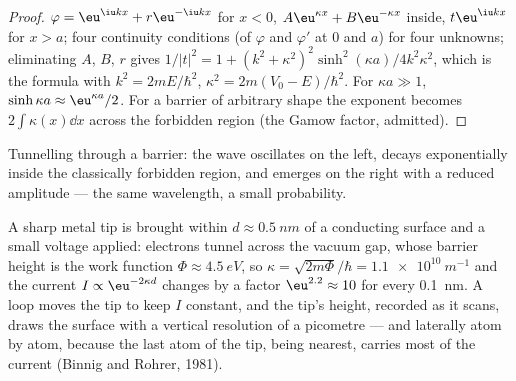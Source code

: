 \begin{proof}
$\varphi = \eu^{\iu kx} + r\eu^{-\iu kx}$ for $x < 0$, $A\eu^{\kappa x} + B\eu^{-\kappa x}$
inside, $t\eu^{\iu kx}$ for $x > a$; four continuity conditions (of $\varphi$
and $\varphi'$ at $0$ and $a$) for four unknowns; eliminating $A$, $B$, $r$
gives $1/|t|^2 = 1 + (k^2 + \kappa^2)^2\sinh^2(\kappa a)/4k^2\kappa^2$, which is
the formula with $k^2 = 2mE/\hbar^2$, $\kappa^2 = 2m(V_0 - E)/\hbar^2$. For
$\kappa a \gg 1$, $\sinh\kappa a \approx \eu^{\kappa a}/2$. For a barrier of
arbitrary shape the exponent becomes $2\int\kappa(x)\dd x$ across the
forbidden region (the Gamow factor, admitted).
\end{proof}

\begin{omfigure}

{\small Tunnelling through a barrier: the wave oscillates on the left,
decays exponentially inside the classically forbidden region, and
emerges on the right with a reduced amplitude --- the same wavelength,
a small probability.}
\end{omfigure}

\begin{example}\label{ex:b2:potential-wells-tunneling:stm}
A sharp metal tip is brought within $d \approx \qty{0.5}{nm}$ of a
conducting surface and a small voltage applied: electrons tunnel across
the vacuum gap, whose barrier height is the work function $\Phi \approx
\qty{4.5}{eV}$, so $\kappa = \sqrt{2m\Phi}/\hbar = \qty{1.1e10}{m^{-1}}$ and
the current $I \propto \eu^{-2\kappa d}$ changes by a factor $\eu^{2.2} \approx
10$ for every \qty{0.1}{nm}. A  loop moves the tip to keep $I$
constant, and the tip's height, recorded as it scans, draws the surface
with a vertical resolution of a picometre --- and laterally atom by
atom, because the last atom of the tip, being nearest, carries most of
the current (Binnig and Rohrer, 1981).
\end{example}

